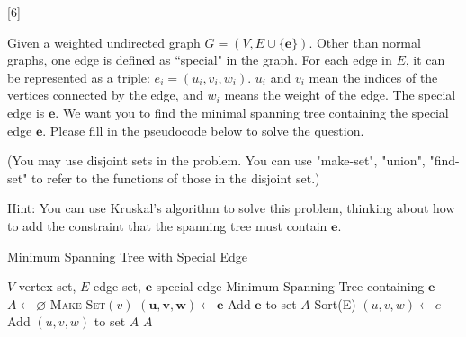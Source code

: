 [6]

Given a weighted undirected graph $G=(V, E\cup\{\mathbf{e}\})$. Other than normal graphs, one edge is defined as ``special" in the graph. For each edge in $E$, it can be represented as a triple: $e_i = (u_i,v_i,w_i)$. $u_i$ and $v_i$ mean the indices of the vertices connected by the edge, and $w_i$ means the weight of the edge. The special edge is $\mathbf{e}$. We want you to find the minimal spanning tree containing the special edge $\mathbf{e}$. Please fill in the pseudocode below to solve the question.

(You may use disjoint sets in the problem. You can use "make-set", "union", "find-set" to refer to the functions of those in the disjoint set.)

Hint: You can use Kruskal's algorithm to solve this problem, thinking about how to add the constraint that the spanning tree must contain $\mathbf{e}$.
\begin{algorithm}
\caption{Minimum Spanning Tree with Special Edge}
\begin{algorithmic}[1] 
    \REQUIRE $V$ vertex set, $E$ edge set, $\mathbf{e}$ special edge
    \ENSURE Minimum Spanning Tree containing $\mathbf{e}$
    \STATE $A \gets \varnothing$
            \STATE \textsc{Make-Set}$(v)$
    \ENDFOR
    \STATE $ (\mathbf u, \mathbf v, \mathbf w) \gets \mathbf{e} $
    \STATE \underline{\hspace{3cm}}
    \STATE Add $\mathbf{e}$ to set $A$
    \STATE Sort(E) 
        \STATE $(u, v, w)\gets e$
        \IF {\underline{\hspace{3cm}}}
            \STATE Add $(u, v, w)$ to set $A$
            \STATE \underline{\hspace{3cm}}
        \ENDIF
    \ENDFOR
    \RETURN $A$
\end{algorithmic}
\end{algorithm}